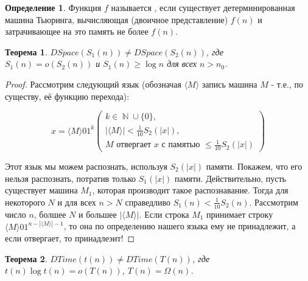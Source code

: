 \documentclass[a4paper]{article}
\theoremstyle{indented}
\newtheorem{theorem}{Теорема}
\theoremstyle{definition}
\newtheorem{defn}{Определение}
\theoremstyle{remark}
\DeclareMathOperator{\NN}{\mathbb{N}}
\begin{document}
\begin{defn}
    Функция $f$ называется , если существует детерминированная машина Тьюринга, вычисляющая (двоичное представление) $f(n)$ и затрачивающее на это память не более $f(n)$.
\end{defn}

\begin{theorem}
    $DSpace(S_1(n)) \neq DSpace(S_2(n))$, где $S_1(n) = o(S_2(n))$ и $S_1(n) \geq \log n$ для всех $n>n_0$.
\end{theorem}

\begin{proof}
    Рассмотрим следующий язык (обозначая $\langle M \rangle$ запись машина $M$ - т.е., по существу, её функцию перехода):

    \begin{equation*}
        x = \langle M \rangle 01^k
        \begin{pmatrix}
            k \in \NN \cup \{0\}, \\ 
            |\langle M \rangle| < \frac{1}{10} S_2(|x|), \\ 
            M \text{ отвергает } x \text{ с памятью } \leq \frac{1}{10} S_2(|x|)
        \end{pmatrix}
    \end{equation*}

    Этот язык мы можем распознать, используя $S_2(|x|)$ памяти. Покажем, что его нельзя распознать, потратив только $S_1(|x|)$ памяти. Действительно, пусть существует машина $M_1$, которая производит такое распознавание. Тогда для некоторого $N$ и для всех $n > N$ справедливо $S_1(n) < \frac{1}{10} S_2(n)$. Рассмотрим число $n$, болшее $N$ и большее $|\langle M \rangle|$. Если строка $M_1$ принимает строку $\langle M \rangle 01^{n - |\langle M \rangle| - 1}$, то она по определению нашего языка ему не принадлежит, а если отвергает, то принадлеэит!
\end{proof}

\begin{theorem}
    $DTime(t(n)) \neq DTime(T(n))$, где $t(n) \log t(n) = o(T(n))$, $T(n) = \Omega(n)$. 
\end{theorem}
\end{document}
